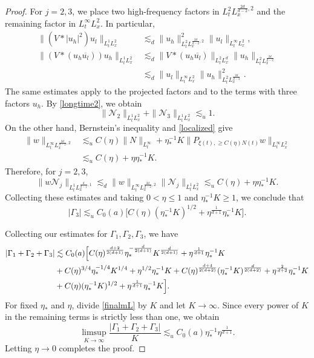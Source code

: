 \documentclass[reqno,11pt]{amsart}
\theoremstyle{plain}
\theoremstyle{definition}
\numberwithin{equation}{section}
\numberwithin{theorem}{section}
\def\geq{\geqslant}
\def\leq{\leqslant}
\begin{document}
\begin{proof}
For $j=2,3$, we place two high-frequency factors in
$L_t^2L_x^{\frac{2d}{d-2},2}$ and the remaining factor in
$L_t^\infty L_x^2$. In particular,
\begin{align*}
 \|(V*|u_h|^2)u_l\|_{L_t^1L_x^2}
 &\lesssim_d\|u_h\|_{L_t^2L_x^{\frac{2d}{d-2},2}}^2
               \|u_l\|_{L_t^\infty L_x^2},\\
 \|(V*(u_h\overline{u_l}))u_h\|_{L_t^1L_x^2}
 &\lesssim_d\|V*(u_h\overline{u_l})\|_{L_t^2L_x^d}
               \|u_h\|_{L_t^2L_x^{\frac{2d}{d-2}}}\\
 &\lesssim_d\|u_l\|_{L_t^\infty L_x^2}
               \|u_h\|_{L_t^2L_x^{\frac{2d}{d-2}}}^2.
\end{align*}
The same estimates apply to the projected factors and to the terms with
three factors $u_h$. By \eqref{longtime2}, we obtain
\[
 \|\mathcal N_2\|_{L_t^1L_x^2}+\|\mathcal N_3\|_{L_t^1L_x^2}\lesssim_u1.
\]
On the other hand, Bernstein's inequality and \eqref{localized} give
\begin{align*}
 \|w\|_{L_t^\infty L_x^{\frac{2d}{d-2},2}}
 &\lesssim_u C(\eta)\|N\|_{L_t^\infty}
       +\eta_{\ast}^{-1}K
          \|P_{\xi(t),\geq C(\eta)N(t)}w\|_{L_t^\infty L_x^2}\\
 &\lesssim_u C(\eta)+\eta\eta_{\ast}^{-1}K.
\end{align*}
Therefore, for $j=2,3$,
\[
 \|w\mathcal N_j\|_{L_t^1L_x^{\frac d{d-1},1}}
 \lesssim_d\|w\|_{L_t^\infty L_x^{\frac{2d}{d-2},2}}
             \|\mathcal N_j\|_{L_t^1L_x^2}
 \lesssim_u C(\eta)+\eta\eta_{\ast}^{-1}K.
\]
Collecting these estimates and taking $0<\eta\leq1$ and
$\eta_{\ast}^{-1}K\geq1$, we conclude that
\[
 |\Gamma_3|\lesssim_u C_0(a)
 \big[C(\eta)(\eta_{\ast}^{-1}K)^{1/2}
                 +\eta^{\frac1{d+1}}\eta_{\ast}^{-1}K\big].
\]

Collecting our estimates for $\Gamma_1,\Gamma_2,\Gamma_3$, we have
\begin{align}
    \left|\Gamma_1+\Gamma_2+ \Gamma_3\right| &\lesssim C_0(a)\Bigl[C(\eta)^{\frac{d+2}{2(d+1)}}\eta_{\ast}^{-\frac{d}{2(d+1)}}K^{\frac{d}{2(d+1)}}+\eta^{\frac{1}{d+1}}\eta_{\ast}^{-1}K\notag\\
    &+ C(\eta)^{3/4}\eta_{\ast}^{-1/4}K^{1/4}+\eta^{1/2}\eta_{\ast}^{-1}K
    +C(\eta)^{\frac{d+4}{2(d+2)}}(\eta_{\ast}^{-1}K)^{\frac{d}{2(d+2)}}+\eta^{\frac{2}{d+2}} \eta_{\ast}^{-1}K\notag\\
    &+C(\eta)(\eta_{\ast}^{-1}K)^{1/2}+\eta^{\frac{1}{d+1}}\eta_{\ast}^{-1}K\Bigr].\label{finalmL}
\end{align}
For fixed $\eta_{\ast}$ and $\eta$, divide \eqref{finalmL} by $K$ and
let $K\to\infty$. Since every power of $K$ in the remaining terms is
strictly less than one, we obtain
\[
 \limsup_{K\to\infty}\frac{|\Gamma_1+\Gamma_2+\Gamma_3|}{K}
 \lesssim_u C_0(a)\eta_{\ast}^{-1}\eta^{\frac1{d+1}}.
\]
Letting $\eta\to0$ completes the proof.
\end{proof}
\end{document}
